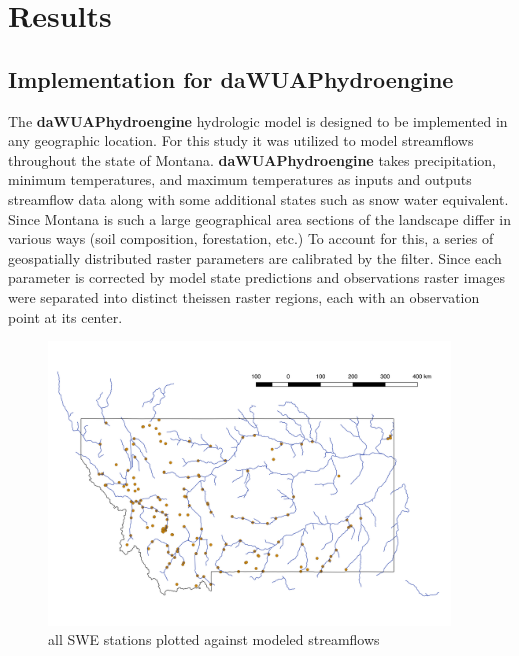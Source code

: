 \chapter{Results}



\section{Implementation for daWUAPhydroengine}

The \textbf{daWUAPhydroengine} hydrologic model is designed to be implemented in any geographic location. For this study it was utilized to model streamflows throughout the state of Montana. \textbf{daWUAPhydroengine} takes precipitation, minimum temperatures, and maximum temperatures as inputs and outputs streamflow data along with some additional states such as snow water equivalent. Since Montana is such a large geographical area sections of the landscape differ in various ways (soil composition, forestation, etc.) To account for this, a series of geospatially distributed raster parameters are calibrated by the filter. Since each parameter is corrected by model state predictions and observations raster images were separated into distinct theissen raster regions, each with an observation point at its center.

\begin{figure}[h]
    \centering
    \includegraphics[width=0.95\textwidth]{stations}
    \caption{all SWE stations plotted against modeled streamflows}
    \label{fig:stations}
\end{figure}

